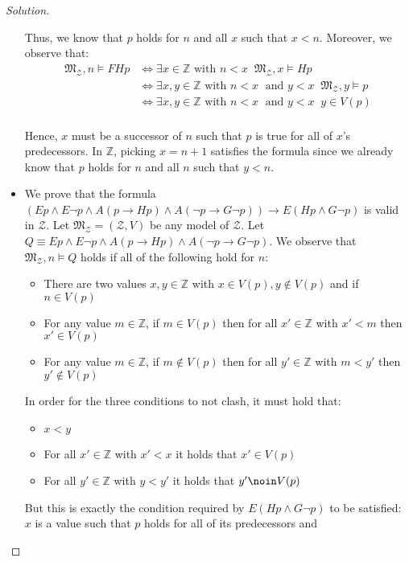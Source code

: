 \documentclass[12pt,a4paper]{report}
\theoremstyle{definition}
\newcommand{\Z}{\mathbb{Z}}                     %
\newcommand{\model}[1]{\mathfrak{#1}}           %
\begin{document}
\begin{proof}[Solution]
\begin{itemize}
            Thus, we know that $p$ holds for $n$ and all $x$ such that $x < n$. Moreover, we observe that:
            \[\begin{split}
                \model{M}_{\mathcal{Z}}, n \models FHp & \iff \exists x \in \Z \text{ with } n < x \;\; \model{M}_{\mathcal{Z}}, x \models Hp \\
                & \iff \exists x,y \in \Z \text{ with } n < x \; \text{ and } y < x \;\;  \model{M}_{\mathcal{Z}}, y \models p \\
                & \iff \exists x,y \in \Z \text{ with } n < x \; \text{ and } y < x \;\; y \in V(p) \\
            \end{split}\]
            
            Hence, $x$ must be a successor of $n$ such that $p$ is true for all of $x$'s predecessors. In $\Z$, picking $x = n+1$ satisfies the formula since we already know that $p$ holds for $n$ and all $n$ such that $y < n$.

            \item We prove that the formula $(Ep \land E \lnot p \land A(p \to Hp) \land A(\lnot p \to G \lnot p)) \to E(Hp \land G \lnot p)$ is valid in $\mathcal{Z}$. Let $\model{M}_{\mathcal{Z}} = (\mathcal{Z}, V)$ be any model of $\mathcal{Z}$. Let $Q \equiv Ep \land E \lnot p \land A(p \to Hp) \land A(\lnot p \to G \lnot p)$. We observe that $\model{M}_{\mathcal{Z}}, n \models Q$ holds if all of the following hold for $n$:
            \begin{itemize}
                \item There are two values $x,y \in \Z$ with $x \in V(p), y \notin V(p)$ and if $n \in V(p)$
                \item For any value $m \in \Z$, if $m \in V(p)$ then for all $x' \in \Z$ with $x' < m$ then $x' \in V(p)$
                \item For any value $m \in \Z$, if $m \notin V(p)$ then for all $y' \in \Z$ with $m < y'$ then $y' \notin V(p)$
            \end{itemize} 
            
            In order for the three conditions to not clash, it must hold that:
            \begin{itemize}
                \item $x < y$
                \item For all $x' \in \Z$ with $x' < x$ it holds that $x' \in V(p)$ 
                \item For all $y' \in \Z$ with $y < y'$ it holds that $y' \noin V(p)$ 
            \end{itemize}

            But this is exactly the condition required by $E(Hp \land G \lnot p)$ to be satisfied: $x$ is a value such that $p$ holds for all of its predecessors and 

        \end{itemize}
    \end{proof}
\end{document}
